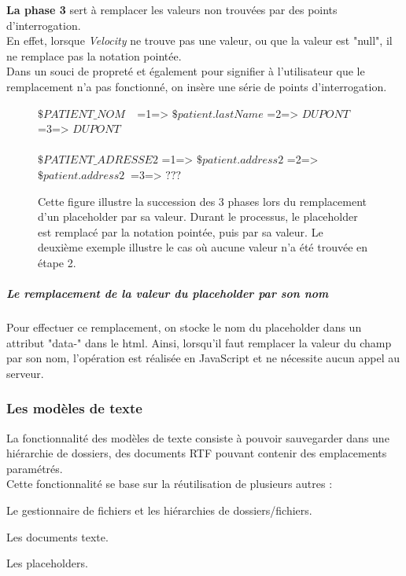 \textbf{La phase 3} sert à remplacer les valeurs non trouvées par des points d'interrogation.\\
En effet, lorsque \textit{Velocity} ne trouve pas une valeur, ou que la valeur est "null", il ne remplace pas la notation pointée.\\
Dans un souci de propreté et également pour signifier à l'utilisateur que le remplacement n'a pas fonctionné, on insère une série de points d'interrogation.


\begin{figure}[H]
	\color{darkgray} 
	\centering
$\$PATIENT\_NOM$ $~~$ =1=> $\$patient.lastName$ =2=> $DUPONT$ $~$ =3=> $DUPONT$ $~$\\ $~$\\
  $\$PATIENT\_ADRESSE2$  =1=> $\$patient.address2$ =2=> $\$patient.address2~$ =3=> $???$ 	
	\caption{\color{black} \label{fig:annotations} Cette figure illustre la succession des 3 phases lors du remplacement d'un placeholder par sa valeur. Durant le processus, le placeholder est remplacé par la notation pointée, puis par sa valeur. Le deuxième exemple illustre le cas où aucune valeur n'a été trouvée en étape 2.}
\end{figure}

\subparagraph*{Le remplacement de la valeur du placeholder par son nom}
Pour effectuer ce remplacement, on stocke le nom du placeholder dans un attribut "data-" dans le html. Ainsi, lorsqu'il faut remplacer la valeur du champ par son nom, l'opération est réalisée en JavaScript et ne nécessite aucun appel au serveur.




\subsubsection{Les modèles de texte}
La fonctionnalité des modèles de texte consiste à pouvoir sauvegarder dans une hiérarchie de dossiers, des documents RTF pouvant contenir des emplacements paramétrés.\\
Cette fonctionnalité se base sur la réutilisation de plusieurs autres :
\begin{sitemize}
\item Le gestionnaire de fichiers et les hiérarchies de dossiers/fichiers.
\item Les documents texte.
\item Les placeholders.
\end{sitemize}

